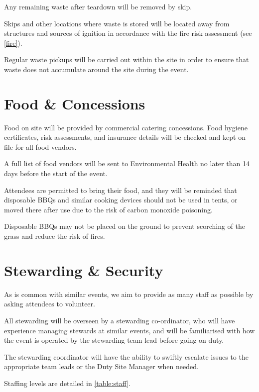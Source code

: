 Any remaining waste after teardown will be removed by skip.

Skips and other locations where waste is stored will be located away from structures and
sources of ignition in accordance with the fire risk assessment (see \cref{fire}).

Regular waste pickups will be carried out within the site in order to ensure that waste does
not accumulate around the site during the event.

\section{Food \& Concessions}\label{food}

Food on site will be provided by commercial catering concessions. Food hygiene certificates,
risk assessments, and insurance details will be checked and kept on file for all food vendors.

A full list of food vendors will be sent to Environmental Health no later than 14 days before
the start of the event.

Attendees are permitted to bring their food, and they will be reminded that disposable BBQs and
similar cooking devices should not be used in tents, or moved there after use due to the risk
of carbon monoxide poisoning.

Disposable BBQs may not be placed on the ground to prevent scorching of the grass
and reduce the risk of fires.

\section{Stewarding \& Security}

As is common with similar events, we aim to provide as many staff as possible
by asking attendees to volunteer.

All stewarding will be overseen by a stewarding co-ordinator, who
will have experience managing stewards at similar events, and will be familiarised
with how the event is operated by the stewarding team lead before going on duty.

The stewarding coordinator will have the ability to swiftly
escalate issues to the appropriate team leads or the Duty Site Manager when needed.

Staffing levels are detailed in \cref{table:staff}.

